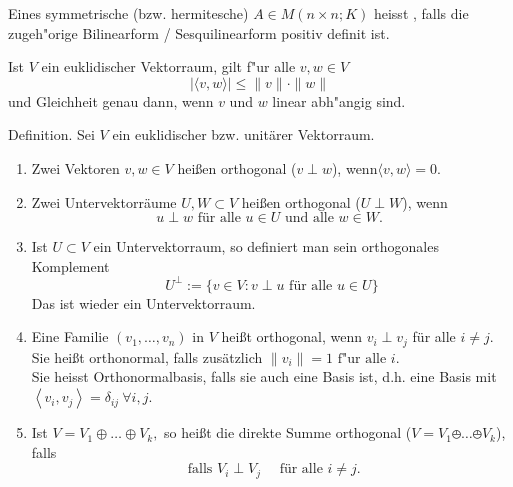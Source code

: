 \documentclass[11pt, a4paper]{article}
\begin{document}
\begin{remark}
Eines symmetrische (bzw. hermitesche)  $A \in M( n \times n; K)$ heisst , falls die zugeh"orige Bilinearform / Sesquilinearform positiv definit ist. 
\end{remark}

\begin{theorem}  Ist $V$ ein euklidischer Vektorraum, gilt f"ur alle $v, w \in V$
\begin{equation*}
|\langle v, w\rangle| \leq\|v\| \cdot\|w\|
\end{equation*}
und Gleichheit genau dann, wenn $v$ und $w$ linear abh"angig sind.
\end{theorem}

\begin{definition}
Definition. Sei \(V\) ein euklidischer bzw. unitärer Vektorraum.
\begin{enumerate}
\item Zwei Vektoren \(v, w \in V\) heißen orthogonal ($v \perp w$), wenn$\langle v, w\rangle= 0.$
\item Zwei Untervektorräume \(U, W \subset V\) heißen orthogonal ($U \perp W$), wenn
\begin{equation*}
u \perp w \text { für alle } u \in U \text { und alle } w \in W \text {. }
\end{equation*}
\item Ist \(U \subset V\) ein Untervektorraum, so definiert man sein orthogonales Komplement
\begin{equation*}
U^{\perp}:=\{v \in V: v \perp u \text { für alle } u \in U\}
\end{equation*}
Das ist wieder ein Untervektorraum.
\item Eine Familie \(\left(v_{1}, \ldots, v_{n}\right)\) in \(V\) heißt orthogonal, wenn
$v_{i} \perp v_{j}$ für alle $ i \neq j.$
\\Sie heißt orthonormal, falls zusätzlich $
\|v_i\| = 1 \text{ f"ur alle } i.
$
\\Sie heisst Orthonormalbasis, falls sie auch eine Basis ist, d.h. eine Basis mit
$\left\langle v_{i}, v_{j}\right\rangle=\delta_{i j} \ \forall i, j.$
\item Ist \(V=V_{1} \oplus \ldots \oplus V_{k},\) so heißt die direkte Summe orthogonal ($V=V_{1} \obot \ldots \obot V_{k}$), falls
\begin{equation*}
\text { falls } V_{i} \perp V_{j} \quad \text { für alle } i \neq j.
\end{equation*}
\end{enumerate}
\end{definition}
\end{document}
